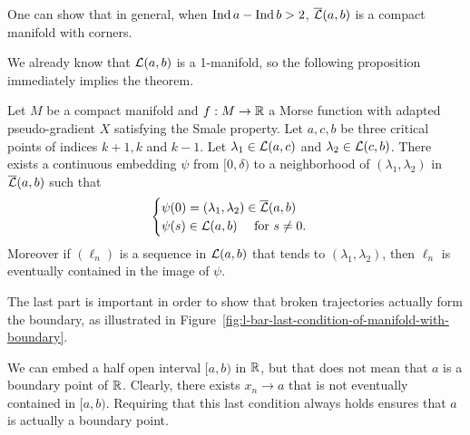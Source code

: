 \begin{remark}
    One can show that in general, when $\operatorname{Ind} a - \operatorname{Ind} b > 2$,  $\overline{\mathcal L}(a, b)$ is a compact manifold with corners.
\end{remark}

We already know that $\mathcal L(a, b)$ is a 1-manifold, so the following proposition immediately implies the theorem.

\begin{prop}
    Let $M$ be a compact manifold and $f: M \to  \mathbb{R}$ a Morse function with adapted pseudo-gradient $X$ satisfying the Smale property. Let  $a,c,b$ be three critical points of indices  $k+1, k$ and $k-1$. Let $\lambda_1 \in \mathcal L(a, c)$ and $\lambda_2 \in \mathcal L(c, b)$.
    There exists a continuous embedding $\psi$ from $[0, \delta)$ to a neighborhood of $(\lambda_1, \lambda_2)$ in $\overline{\mathcal L}(a, b)$ such that
    \[
    \begin{cases}
        \psi(0) = (\lambda_1, \lambda_2) \in \overline{\mathcal L}(a, b)\\
        \psi(s) \in \mathcal L(a, b) \quad \text{ for } s \neq 0.
    \end{cases}
    \] 
    Moreover if $(\ell_n)$ is a sequence in $\mathcal L(a, b)$ that tends to $(\lambda_1, \lambda_2)$, then $ \ell_n$ is eventually contained in the image of $\psi$.
\end{prop}

The last part is important in order to show that broken trajectories actually form the boundary, as illustrated in Figure~\ref{fig:l-bar-last-condition-of-manifold-with-boundary}.
\begin{marginfigure}
    \centering
    \caption{We can embed a half open interval $[a, b)$ in $\mathbb{R}$, but that does not mean that $a$ is a boundary point of $\mathbb{R}$. Clearly, there exists $x_n \to a$ that is not eventually contained in $[a,b)$.
        Requiring that this last condition always holds ensures that $a$ is actually a boundary point.
    }
    \label{fig:l-bar-last-condition-of-manifold-with-boundary}
\end{marginfigure}

